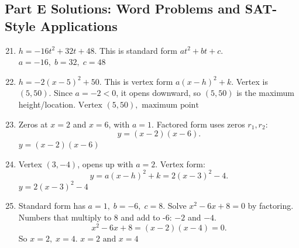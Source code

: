 \documentclass[14pt]{extarticle}
\begin{document}
\subsection*{Part E Solutions: Word Problems and SAT-Style Applications}
\begin{enumerate}
  \setcounter{enumi}{20}
  \item \(h = -16t^2 + 32t + 48.\)  
  This is standard form \(at^2 + bt + c.\)  
  \(\boxed{a = -16,\; b = 32,\; c = 48}\)

  \item \(h = -2(x - 5)^2 + 50.\)  
  This is vertex form \(a(x - h)^2 + k.\)  
  Vertex is \((5, 50)\).  
  Since \(a = -2 < 0\), it opens downward, so \((5, 50)\) is the maximum height/location.  
  \(\boxed{\text{Vertex } (5, 50), \text{ maximum point}}\)

  \item Zeros at \(x = 2\) and \(x = 6\), with \(a = 1.\)  
  Factored form uses zeros \(r_1, r_2\):  
  \[
  y = (x - 2)(x - 6).
  \]
  \(\boxed{y = (x - 2)(x - 6)}\)

  \item Vertex \((3, -4)\), opens up with \(a = 2.\)  
  Vertex form:  
  \[
  y = a(x - h)^2 + k = 2(x - 3)^2 - 4.
  \]
  \(\boxed{y = 2(x - 3)^2 - 4}\)

  \item Standard form has \(a = 1,\; b = -6,\; c = 8.\)  
  Solve \(x^2 - 6x + 8 = 0\) by factoring.  
  Numbers that multiply to 8 and add to -6: \(-2\) and \(-4.\)  
  \[
  x^2 - 6x + 8 = (x - 2)(x - 4) = 0.
  \]
  So \(x = 2,\; x = 4.\)  
  \(\boxed{x = 2 \text{ and } x = 4}\)
\end{enumerate}





\end{document}
